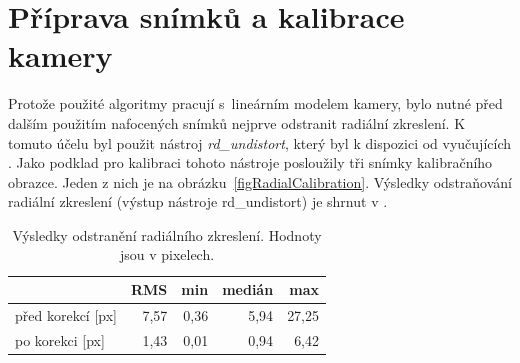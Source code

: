 \documentclass[11pt,oneside,a4paper,pdftex]{article}   %
\begin{document}

\section{Příprava snímků a kalibrace kamery}

	Protože použité algoritmy pra\-cují s~lineárním modelem kamery, bylo nutné před dalším použitím
	nafocených snímků nej\-prve odstranit radiální zkreslení. K tomuto účelu byl použit nástroj
	\emph{rd\_undistort}, který byl k dispozici od vyučujících \cite{code_repo}.  Jako podklad pro
	kalibraci tohoto nástroje posloužily tři snímky kalibračního obrazce. Jeden z nich je na
	obrázku~\ref{figRadialCalibration}. Výsledky odstraňování radiální zkreslení (výstup nástroje
	rd\_undistort) je shrnut v .

		\begin{table}[h]
			\centering
			\begin{tabular}{|l|rrrr|}
				\hline
									& RMS	& min	& medián	& max	\\
				\hline
				před korekcí [px]	& 7,57	& 0,36	& 5,94		& 27,25		\\
				po korekci [px]		& 1,43	& 0,01	& 0,94		& 6,42		\\
				\hline
			\end{tabular}
			\caption{Výsledky odstranění radiálního zkreslení. Hodnoty jsou v pixelech.}
			\label{tabRd_undistort}
		\end{table}
	
	\def\IAC{\boldsymbol \omega}
	
\end{document}
